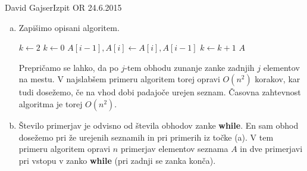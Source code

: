 \begin{naloga}{David Gajser}{Izpit OR 24.6.2015}
\begin{odgovor}
\begin{enumerate}[(a)]
Primer lahko posplošimo na sezname $A[1 \dots n]$ poljubne dolžine,
za katere velja $A[i-1] \le A[i]$ ($2 \le i \le n-1$) in $A[n] < A[n-2]$.
Tako kot v prejšnjem primeru algoritem zamenja le zadnja dva elementa,
kar pa ne zadostuje za pravilno ureditev.

\item Zapišimo opisani algoritem.
\begin{small}
\begin{algorithmic}
\State $k \gets 2$
    \State $k \gets 0$
            \State $A[i-1], A[i] \gets A[i], A[i-1]$
            \State $k \gets k+1$
        \EndIf
    \EndFor
\EndWhile
\State \Return $A$
\end{algorithmic}
\end{small}
Prepričamo se lahko,
da po $j$-tem obhodu zunanje zanke zadnjih $j$ elementov na mestu.
V najslabšem primeru algoritem torej opravi $O(n^2)$ korakov,
kar tudi dosežemo, če na vhod dobi padajoče urejen seznam.
Časovna zahtevnost algoritma je torej $O(n^2)$.

\item Število primerjav je odvisno od števila obhodov zanke {\bf while}.
En sam obhod dosežemo pri že urejenih seznamih in pri primerih iz točke (a).
V tem primeru algoritem opravi $n$ primerjav elementov seznama $A$
in dve primerjavi pri vstopu v zanko {\bf while}
(pri zadnji se zanka konča).
\end{enumerate}
\end{odgovor}
\end{naloga}
